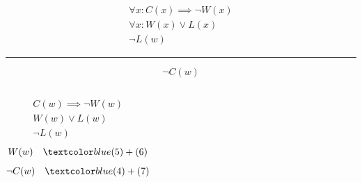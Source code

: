 \begin{frame}{}
  \begin{gather}
    \forall x: C(x) \implies \lnot W(x) \\[5pt]
    \forall x: W(x) \lor L(x) \\[5pt]
    \lnot L(w)
  \end{gather}
  
  \hrule
  \[
    \lnot C(w)
  \]

  \pause
  \begin{columns}
      \begin{gather}
	C(w) \implies \lnot W(w) \\[5pt]
	W(w) \lor L(w) \\[5pt]
	\lnot L(w)
      \end{gather}
      \begin{gather}
	W(w) \quad \blue{(5) + (6)} \\[5pt]
	\lnot C(w) \quad \blue{(4) + (7)} 
      \end{gather}
  \end{columns}
\end{frame}
